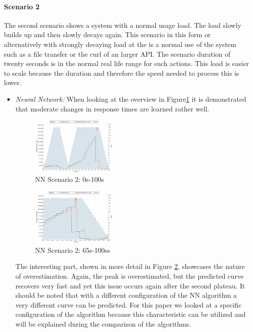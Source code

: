 \paragraph*{Scenario 2}
The second scenario shows a system with a normal usage load. The load slowly builds up and then slowly decays again. This scenario in this form or alternatively with strongly decaying load at the is a normal use of the system such as a file transfer or the curl of an larger API.  The scenario duration of twenty seconds is in the normal real life range for such actions. This load is easier to scale because the duration and therefore the speed needed to process this is lower.

\begin{itemize}
\item \textit{Neural Network:} When looking at the overview in Figure\ref{fig:NN2_1} it is demonstrated that moderate changes in response times are learned rather well. 

\begin{figure}[ht]
	\begin{center}
		\includegraphics[width=0.40\textwidth]{chapters/chapter5/fig/NN2_1}
	\end{center}
	\caption{NN Scenario 2: 0s-100s}
	\label{fig:NN2_1}
\end{figure}

\begin{figure}[ht]
	\begin{center}
		\includegraphics[width=0.40\textwidth]{chapters/chapter5/fig/NN2_2}
	\end{center}
	\caption{NN Scenario 2: 65s-100ss}
	\label{fig:NN2_2}
\end{figure}

The interesting part, shown in more detail in Figure \ref{fig:NN2_2}, showcases the nature of overestimation. Again, the peak is overestimated, but the predicted curve recovers very fast and yet this issue occurs again after the second plateau. It should be noted that with a different configuration of the NN algorithm a very different curve can be predicted. For this paper we looked at a specific configuration of the algorithm because this characteristic can be utilized and will be explained during the comparison of the algorithms.



\end{itemize}

